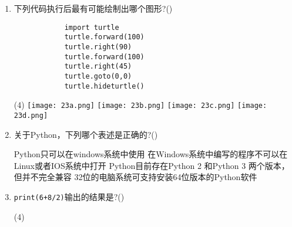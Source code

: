\documentclass[11pt]{ctexart}
\begin{document}
\begin{enumerate}
        \item 下列代码执行后最有可能绘制出哪个图形?(\qquad)
        \begin{lstlisting}
            import turtle
            turtle.forward(100)
            turtle.right(90)
            turtle.forward(100)
            turtle.right(45)
            turtle.goto(0,0)
            turtle.hideturtle()
        \end{lstlisting}
        \begin{tasks}(4)
            \task \texttt{[image: 23a.png]}
            \task \texttt{[image: 23b.png]}
            \task \texttt{[image: 23c.png]}
            \task \texttt{[image: 23d.png]}
        \end{tasks}

        \newpage
        \item 关于Python，下列哪个表述是正确的?(\qquad)
        \begin{tasks}
            \task Python只可以在windows系统中使用
            \task 在Windows系统中编写的程序不可以在Linux或者IOS系统中打开
            \task Python目前存在Python 2 和Python 3 两个版本，但并不完全兼容
            \task 32位的电脑系统可支持安装64位版本的Python软件
        \end{tasks}

        \item \lstinline!print(6+8/2)!输出的结果是?(\qquad)
        \begin{tasks}(4)
        \end{tasks}
    \end{enumerate}
\end{document}
